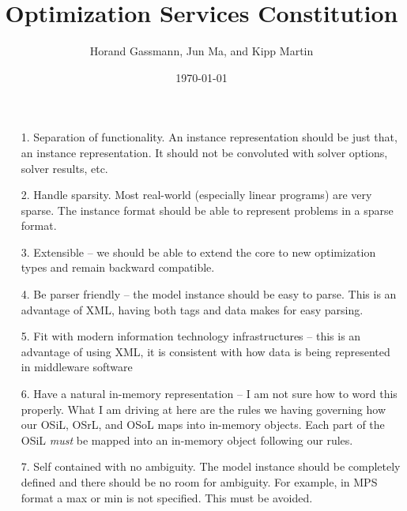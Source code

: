 \documentclass[11pt]{amsart}
\title{Optimization Services Constitution}
\author{Horand Gassmann, Jun Ma, and Kipp Martin}
\date{\today}                                           %
\begin{document}
\maketitle



\begin{itemize}


\item[1.]  Separation of functionality. An instance representation should be just that, an instance representation. It should not be convoluted with solver options, solver results, etc.

\item[2.]  Handle sparsity.  Most real-world (especially linear programs) are very sparse.  The instance format should be able to represent problems in a sparse format. 

\item[3.]  Extensible  -- we should be able to extend the core to new optimization types and remain backward compatible. 

\item[4.] Be parser friendly -- the model instance should be easy to parse. This is an advantage of XML, having both tags and data makes for easy parsing. 

\item[5.]   Fit with modern information technology infrastructures -- this is an advantage of using XML, it is consistent with how data is being represented  in middleware software

\item[6.] Have a natural in-memory representation  -- I am not sure how to word this properly. What I am driving at here  are the rules we  having governing how our OSiL, OSrL, and OSoL maps into in-memory objects. Each part of the OSiL  {\it must} be mapped into an in-memory object following our rules. 


\item[7.]  Self contained with no ambiguity.  The model instance should be completely defined and there should  be no room for ambiguity. For example, in MPS format a max or min is not specified. This must be  avoided. 


\end{itemize}
\end{document}
